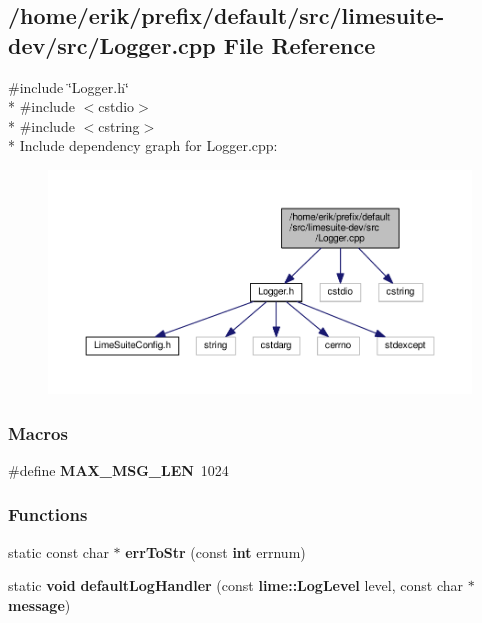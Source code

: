 \subsection{/home/erik/prefix/default/src/limesuite-\/dev/src/\+Logger.cpp File Reference}
\label{limesuite-dev_2src_2Logger_8cpp}
{\ttfamily \#include \char`\"{}Logger.\+h\char`\"{}}\\*
{\ttfamily \#include $<$cstdio$>$}\\*
{\ttfamily \#include $<$cstring$>$}\\*
Include dependency graph for Logger.\+cpp\+:
\nopagebreak
\begin{figure}[H]
\begin{center}
\leavevmode
\includegraphics[width=350pt]{d7/d6d/limesuite-dev_2src_2Logger_8cpp__incl}
\end{center}
\end{figure}
\subsubsection*{Macros}
\begin{DoxyCompactItemize}
\item 
\#define {\bf M\+A\+X\+\_\+\+M\+S\+G\+\_\+\+L\+EN}~1024
\end{DoxyCompactItemize}
\subsubsection*{Functions}
\begin{DoxyCompactItemize}
\item 
static const char $\ast$ {\bf err\+To\+Str} (const {\bf int} errnum)
\item 
static {\bf void} {\bf default\+Log\+Handler} (const {\bf lime\+::\+Log\+Level} level, const char $\ast${\bf message})
\end{DoxyCompactItemize}
